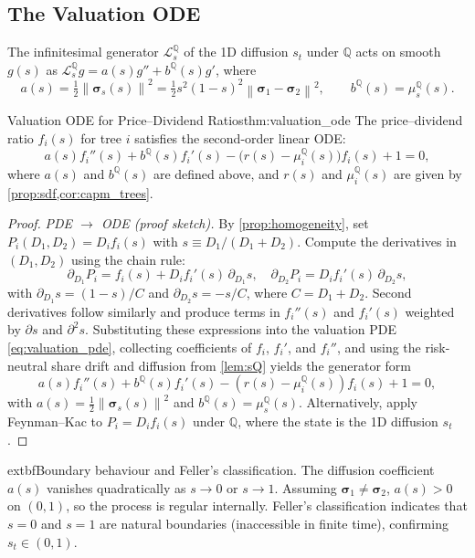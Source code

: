 ﻿\documentclass[11pt,letterpaper,oneside]{article}
\numberwithin{equation}{section}
\newcommand{\1}{\mathbf{1}}
\newcommand{\norm}[1]{\left\lVert #1\right\rVert}
\begin{document}
\subsection{The Valuation ODE}

The infinitesimal generator $\mathcal{L}^{\mathbb{Q}}_s$ of the 1D diffusion $s_t$ under $\mathbb{Q}$ acts on smooth $g(s)$ as $\mathcal{L}^{\mathbb{Q}}_s g = a(s) g'' + b^{\mathbb{Q}}(s) g'$, where
\[
  a(s) = \tfrac12 \norm{\bm{\sigma}_s(s)}^2 = \tfrac12 s^2(1-s)^2\norm{\bm{\sigma}_1-\bm{\sigma}_2}^2,\qquad
  b^{\mathbb{Q}}(s)=\mu_s^{\mathbb{Q}}(s).
\]

\begin{theorem}{Valuation ODE for Price--Dividend Ratios}{thm:valuation_ode}
The price--dividend ratio $f_i(s)$ for tree $i$ satisfies the second-order linear ODE:
\begin{equation}\label{eq:ode_price}
  a(s) f_i''(s) + b^{\mathbb{Q}}(s) f_i'(s) - \big(r(s)-\mu_i^{\mathbb{Q}}(s)\big) f_i(s) + 1 = 0,
\end{equation}
where $a(s)$ and $b^{\mathbb{Q}}(s)$ are defined above, and $r(s)$ and $\mu_i^{\mathbb{Q}}(s)$ are given by \cref{prop:sdf,cor:capm_trees}.
\end{theorem}
\begin{proof}
\emph{PDE $\to$ ODE (proof sketch).} By \cref{prop:homogeneity}, set $P_i(D_1,D_2)=D_i f_i(s)$ with $s\equiv D_1/(D_1+D_2)$. Compute the derivatives in $(D_1,D_2)$ using the chain rule:
\[
  \partial_{D_1} P_i = f_i(s) + D_i f_i'(s)\,\partial_{D_1}s,\quad
  \partial_{D_2} P_i = D_i f_i'(s)\,\partial_{D_2}s,
\]
with $\partial_{D_1}s = (1-s)/C$ and $\partial_{D_2}s = -s/C$, where $C=D_1+D_2$. Second derivatives follow similarly and produce terms in $f_i''(s)$ and $f_i'(s)$ weighted by $\partial s$ and $\partial^2 s$. Substituting these expressions into the valuation PDE \eqref{eq:valuation_pde}, collecting coefficients of $f_i$, $f_i'$, and $f_i''$, and using the risk-neutral share drift and diffusion from \cref{lem:sQ} yields the generator form
\[
  a(s) f_i''(s) + b^{\mathbb{Q}}(s) f_i'(s) - (r(s)-\mu_i^{\mathbb{Q}}(s)) f_i(s) + 1 = 0,
\]
with $a(s)=\tfrac12\norm{\bm{\sigma}_s(s)}^2$ and $b^{\mathbb{Q}}(s)=\mu_s^{\mathbb{Q}}(s)$. Alternatively, apply Feynman--Kac to $P_i=D_i f_i(s)$ under $\mathbb{Q}$, where the state is the 1D diffusion $s_t$.
\end{proof}

\begin{tcolorbox}[mathstyle]
  	extbf{Boundary behaviour and Feller's classification.} The diffusion coefficient $a(s)$ vanishes quadratically as $s\to0$ or $s\to1$. Assuming $\bm{\sigma}_1\neq\bm{\sigma}_2$, $a(s)>0$ on $(0,1)$, so the process is regular internally. Feller's classification indicates that $s=0$ and $s=1$ are natural boundaries (inaccessible in finite time), confirming $s_t\in(0,1)$.
\end{tcolorbox}
\end{document}
